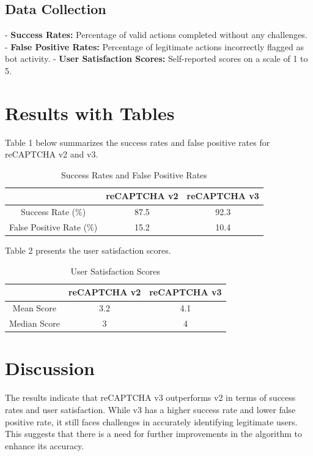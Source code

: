 \subsection{Data Collection}
- \textbf{Success Rates:} Percentage of valid actions completed without any challenges.
- \textbf{False Positive Rates:} Percentage of legitimate actions incorrectly flagged as bot activity.
- \textbf{User Satisfaction Scores:} Self-reported scores on a scale of 1 to 5.

\section{Results with Tables}
Table 1 below summarizes the success rates and false positive rates for reCAPTCHA v2 and v3.

\begin{table}[htbp]
\centering
\caption{Success Rates and False Positive Rates}
\label{tab:success-fprates}
\begin{tabular}{|c|c|c|}
\hline
& \textbf{reCAPTCHA v2} & \textbf{reCAPTCHA v3} \\
\hline
Success Rate (\%) & 87.5 & 92.3 \\
False Positive Rate (\%) & 15.2 & 10.4 \\
\hline
\end{tabular}
\end{table}

Table 2 presents the user satisfaction scores.

\begin{table}[htbp]
\centering
\caption{User Satisfaction Scores}
\label{tab:user-satisfaction}
\begin{tabular}{|c|c|c|}
\hline
& \textbf{reCAPTCHA v2} & \textbf{reCAPTCHA v3} \\
\hline
Mean Score & 3.2 & 4.1 \\
Median Score & 3 & 4 \\
\hline
\end{tabular}
\end{table}

\section{Discussion}
The results indicate that reCAPTCHA v3 outperforms v2 in terms of success rates and user satisfaction. While v3 has a higher success rate and lower false positive rate, it still faces challenges in accurately identifying legitimate users. This suggests that there is a need for further improvements in the algorithm to enhance its accuracy.

